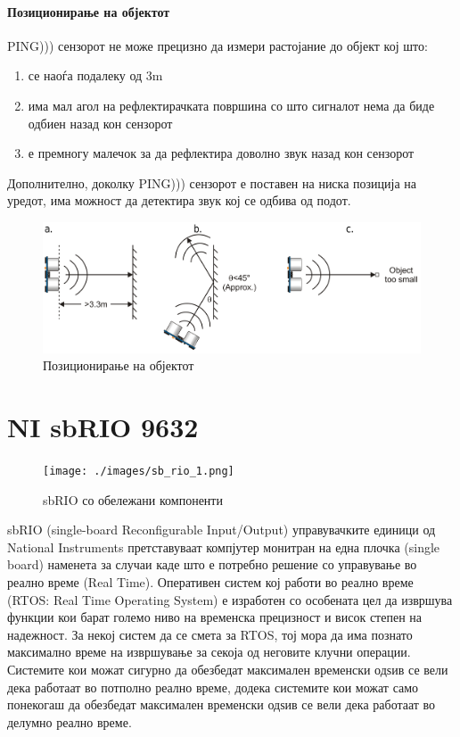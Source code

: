 \documentclass[12pt]{article}
\begin{document}
      \paragraph{Позиционирање на објектот\\}
        PING))) сензорот не може прецизно да измери растојание до објект кој што:

      \renewcommand{\theenumi}{\alph{enumi}}
      \begin{enumerate}
        \item се наоѓа подалеку од 3m
        \item има мал агол на рефлектирачката површина со што сигналот нема да биде одбиен назад кон сензорот
        \item е премногу малечок за да рефлектира доволно звук назад кон сензорот
        \end{enumerate}

		  Дополнително, доколку PING))) сензорот е поставен на ниска позиција на уредот, има можност да детектира звук кој се одбива од подот.

      \begin{figure}[H]
        \includegraphics[width=0.75\linewidth]{./images/ping_obj.png}
        \centering
        \caption{Позиционирање на објектот}
        \label{fig:ping_obj.png}
        \end{figure}

\newpage

\section{NI sbRIO 9632}
	\begin{figure}[h]
		\centering
		\texttt{[image: ./images/sb\_rio\_1.png]}
		\caption{sbRIO со обележани компоненти}
		\label{fig:sb_rio_1.png}
		\end{figure}

  sbRIO (single-board Reconfigurable Input/Output) управувачките единици од National Instruments претставуваат компјутер монитран на една плочка (single board) наменета за случаи каде што е потребно решение со управување во реално време (Real Time). Оперативен систем кој работи во реално време (RTOS: Real Time Operating System) е изработен со особената цел да извршува функции кои барат големо ниво на временска прецизност и висок степен на надежност. За некој систем да се смета за RTOS, тој мора да има познато максимално време на извршување за секоја од неговите клучни операции. Системите кои можат сигурно да обезбедат максимален временски одѕив се вели дека работаат во потполно реално време, додека системите кои можат само понекогаш да обезбедат максимален временски одѕив се вели дека работаат во делумно реално време.
\end{document}
